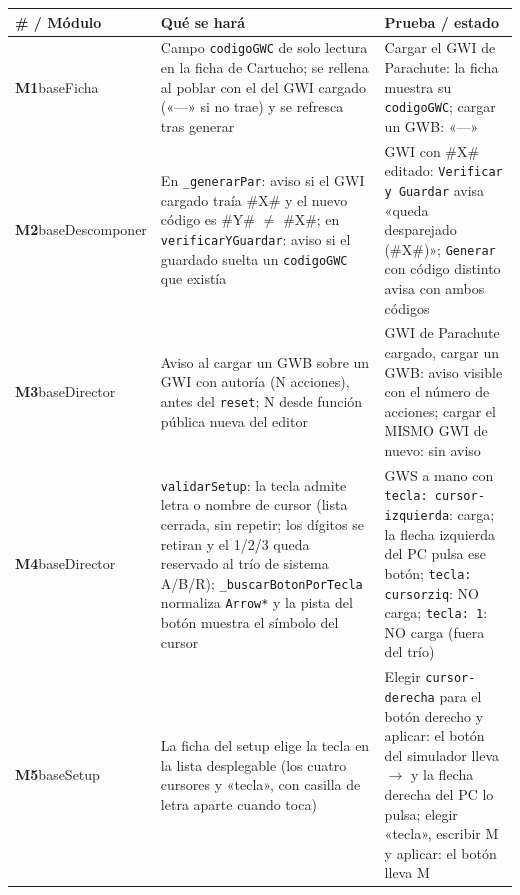 \begin{xltabular}{\textwidth}{>{\RaggedRight\arraybackslash}p{3cm} >{\RaggedRight\arraybackslash{}\hsize}X >{\RaggedRight\arraybackslash{}\hsize}X}
	\toprule
	\textbf{\# / Módulo} & \textbf{Qué se hará} & \textbf{Prueba / estado} \\
	\midrule
	\endhead
	\textbf{M1}\newline baseFicha & Campo \texttt{codigoGWC} de solo lectura en la ficha de Cartucho; se rellena al poblar con el del GWI cargado («---» si no trae) y se refresca tras generar & Cargar el GWI de Parachute: la ficha muestra su \texttt{codigoGWC}; cargar un GWB: «---» \\
	\midrule
	\textbf{M2}\newline baseDescomponer & En \texttt{\_generarPar}: aviso si el GWI cargado traía \#X\# y el nuevo código es \#Y\# $\neq$ \#X\#; en \texttt{verificarYGuardar}: aviso si el guardado suelta un \texttt{codigoGWC} que existía & GWI con \#X\# editado: \texttt{Verificar y Guardar} avisa «queda desparejado (\#X\#)»; \texttt{Generar} con código distinto avisa con ambos códigos \\
	\midrule
	\textbf{M3}\newline baseDirector & Aviso al cargar un GWB sobre un GWI con autoría (N acciones), antes del \texttt{reset}; N desde función pública nueva del editor & GWI de Parachute cargado, cargar un GWB: aviso visible con el número de acciones; cargar el MISMO GWI de nuevo: sin aviso \\
	\midrule
	\textbf{M4}\newline baseDirector & \texttt{validarSetup}: la tecla admite letra o nombre de cursor (lista cerrada, sin repetir; los dígitos se retiran y el 1/2/3 queda reservado al trío de sistema A/B/R); \texttt{\_buscarBotonPorTecla} normaliza \texttt{Arrow*} y la pista del botón muestra el símbolo del cursor & GWS a mano con \texttt{tecla:  cursor-izquierda}: carga; la flecha izquierda del PC pulsa ese botón; \texttt{tecla:  cursorziq}: NO carga; \texttt{tecla:  1}: NO carga (fuera del trío) \\
	\midrule
	\textbf{M5}\newline baseSetup & La ficha del setup elige la tecla en la lista desplegable (los cuatro cursores y «tecla», con casilla de letra aparte cuando toca) & Elegir \texttt{cursor-derecha} para el botón derecho y aplicar: el botón del simulador lleva $\rightarrow$ y la flecha derecha del PC lo pulsa; elegir «tecla», escribir M y aplicar: el botón lleva M \\

\end{xltabular}
